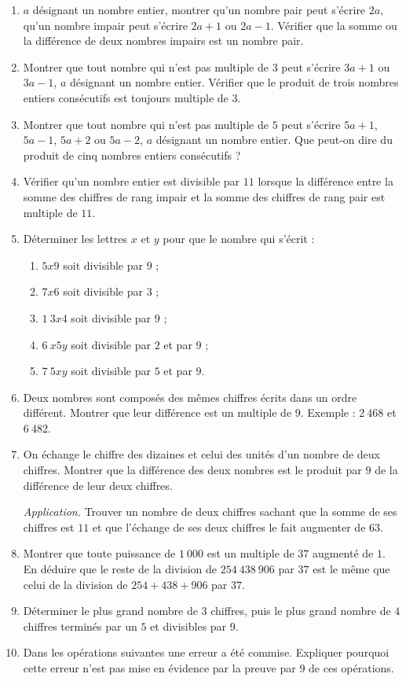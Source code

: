 \documentclass[12 pt]{extarticle}
\theoremstyle{plain}
\begin{document}
\begin{enumerate}
\item  $a$ désignant un nombre entier, montrer qu'un nombre pair peut s'écrire $2a$, qu'un nombre impair peut s'écrire $2a+1$ ou $2a-1$. Vérifier que la somme ou la différence de deux nombres impairs est un nombre pair.  
\item Montrer que tout nombre qui n'est pas multiple de $3$ peut s'écrire $3a+1$ ou $3a-1$, $a$ désignant un nombre entier.
Vérifier que le produit de trois nombres entiers consécutifs est toujours multiple de $3$. 
\item Montrer que tout nombre qui n'est pas multiple de $5$ peut s'écrire $5a+1$, $5a-1$, $5a+2$ ou $5a-2$, $a$ désignant un nombre entier. Que peut-on dire du produit de cinq nombres entiers consécutifs ? 
\item Vérifier qu'un nombre entier est divisible par $11$ lorsque la différence entre la somme des chiffres
de rang impair et la somme des chiffres de rang pair 
est multiple de $11$. 
\item Déterminer les lettres $x$ et $y$ pour que le nombre qui s'écrit : 
\begin{enumerate}
\item $5x9$ soit divisible par $9$ ; 
\item $7x6$ soit divisible par $3$ ; 
\item $1~3x4$ soit divisible par $9$ ; 
\item $6~x5y$ soit divisible par $2$ et par $9$ ; 
\item $7~5xy$ soit divisible par $5$ et par $9$. 
\end{enumerate}
\item Deux nombres sont composés des mêmes chiffres écrits dans un ordre différent. Montrer que leur différence est un multiple de $9$. Exemple : $2~468$
et $6~482$. 
\item On échange le chiffre des dizaines et celui des unités d'un nombre de deux chiffres. Montrer que la différence des deux nombres est le produit par $9$
de la différence de leur deux chiffres. 

\emph{Application.} Trouver un nombre de deux chiffres sachant que la somme de ses chiffres est $11$ et que l'échange de ses deux chiffres le fait augmenter de $63$. 
\item Montrer que toute puissance de $1~000$ est un 
multiple de $37$ augmenté de $1$. En déduire que le reste de la division de $254~438~906$ par $37$ est le même que celui de la division de $254+438+906$ par $37$. 
\item Déterminer le plus grand nombre de $3$ chiffres, puis le plus grand nombre de $4$ chiffres terminés par 
un $5$ et divisibles par $9$. 
\item Dans les opérations suivantes une erreur a été
commise. Expliquer pourquoi cette erreur n'est pas 
mise en évidence par la preuve par $9$ de ces opérations.


\end{enumerate}
\end{document}

